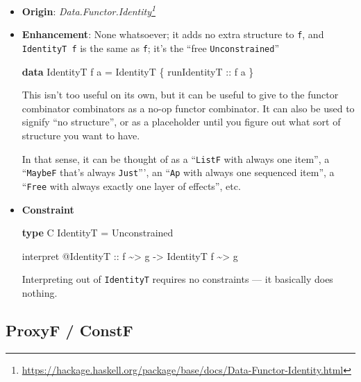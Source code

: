 \documentclass[]{article}
\newenvironment{Shaded}{}{}
\newcommand{\DataTypeTok}[1]{\textcolor[rgb]{0.56,0.13,0.00}{#1}}
\newcommand{\KeywordTok}[1]{\textcolor[rgb]{0.00,0.44,0.13}{\textbf{#1}}}
\newcommand{\NormalTok}[1]{#1}
\newcommand{\OperatorTok}[1]{\textcolor[rgb]{0.40,0.40,0.40}{#1}}
\newcommand{\OtherTok}[1]{\textcolor[rgb]{0.00,0.44,0.13}{#1}}
\renewcommand{\href}[2]{#2\footnote{\url{#1}}}
\begin{document}
\begin{itemize}
\item
  \textbf{Origin}:
  \emph{\href{https://hackage.haskell.org/package/base/docs/Data-Functor-Identity.html}{Data.Functor.Identity}}
\item
  \textbf{Enhancement}: None whatsoever; it adds no extra structure to
  \texttt{f}, and \texttt{IdentityT\ f} is the same as \texttt{f}; it's the
  ``free \texttt{Unconstrained}''

\begin{Shaded}
\begin{Highlighting}[]
\KeywordTok{data} \DataTypeTok{IdentityT}\NormalTok{ f a }\OtherTok{=} \DataTypeTok{IdentityT}\NormalTok{ \{}\OtherTok{ runIdentityT ::}\NormalTok{ f a \}}
\end{Highlighting}
\end{Shaded}

  This isn't too useful on its own, but it can be useful to give to the functor
  combinator combinators as a no-op functor combinator. It can also be used to
  signify ``no structure'', or as a placeholder until you figure out what sort
  of structure you want to have.

  In that sense, it can be thought of as a ``\texttt{ListF} with always one
  item'', a ``\texttt{MaybeF} that's always \texttt{Just}''', an ``\texttt{Ap}
  with always one sequenced item'', a ``\texttt{Free} with always exactly one
  layer of effects'', etc.
\item
  \textbf{Constraint}

\begin{Shaded}
\begin{Highlighting}[]
\KeywordTok{type} \DataTypeTok{C} \DataTypeTok{IdentityT} \OtherTok{=} \DataTypeTok{Unconstrained}

\NormalTok{interpret }\OperatorTok{@}\DataTypeTok{IdentityT}
\OtherTok{    ::}\NormalTok{ f }\OperatorTok{\textasciitilde{}>}\NormalTok{ g}
    \OtherTok{{-}>} \DataTypeTok{IdentityT}\NormalTok{ f }\OperatorTok{\textasciitilde{}>}\NormalTok{ g}
\end{Highlighting}
\end{Shaded}

  Interpreting out of \texttt{IdentityT} requires no constraints --- it
  basically does nothing.
\end{itemize}

\hypertarget{proxyf-constf}{%
\subsection{ProxyF / ConstF}\label{proxyf-constf}}
\end{document}
